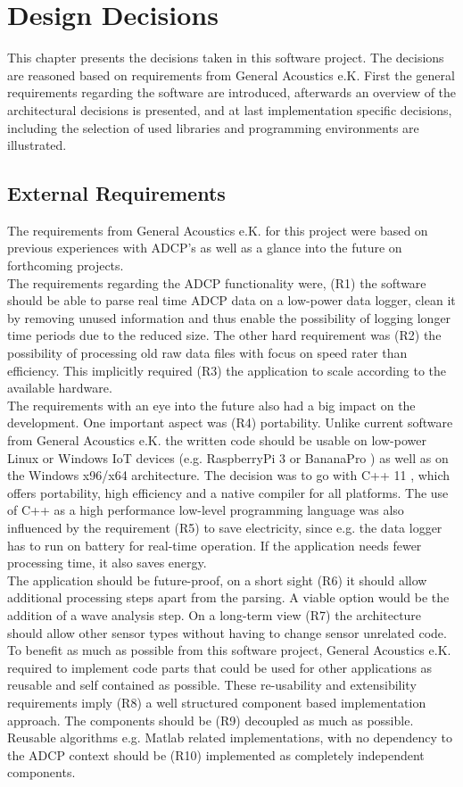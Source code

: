 
\chapter{Design Decisions}
This chapter presents the decisions taken in this software project. The decisions are reasoned based on requirements from General Acoustics e.K. First the general requirements regarding the software are introduced, afterwards an overview of the architectural decisions is presented, and at last implementation specific decisions, including the selection of used libraries and programming environments are illustrated. 
\section{External Requirements}
The requirements from General Acoustics e.K. for this project were based on previous experiences with ADCP's as well as a glance into the future on forthcoming projects.\\ 
The requirements regarding the ADCP functionality were, (R1) the software should be able to parse real time ADCP data on a low-power data logger, clean it by removing unused information and thus enable the possibility of logging longer time periods due to the reduced size. The other hard requirement was (R2) the possibility of processing old raw data files with focus on speed rater than efficiency. This implicitly required (R3) the application to scale according to the available hardware.\\ 
The requirements with an eye into the future also had a big impact on the development. One important aspect was (R4) portability. Unlike current software from General Acoustics e.K. the written code should be usable on low-power Linux or Windows IoT devices (e.g. RaspberryPi 3 \cite{raspberry} or BananaPro \cite{bananapro}) as well as on the Windows x96/x64 architecture. The decision was to go with C++ 11 \cite{cpp_11}, which offers portability, high efficiency and a native compiler for all platforms. The use of C++ as a high performance low-level programming language was also influenced by the requirement (R5) to save electricity, since e.g. the data logger has to run on battery for real-time operation. If the application needs fewer processing time, it also saves energy. \\
The application should be future-proof, on a short sight (R6) it should allow additional processing steps apart from the parsing. A viable option would be the addition of a wave analysis step. On a long-term view (R7) the architecture should allow other sensor types without having to change sensor unrelated code.\\ 
To benefit as much as possible from this software project, General Acoustics e.K. required to implement code parts that could be used for other applications as reusable and self contained as possible. These re-usability and extensibility requirements imply (R8) a well structured component based implementation approach. The components should be (R9) decoupled as much as possible. Reusable algorithms e.g. Matlab related implementations, with no dependency to the ADCP context should be (R10) implemented as completely independent components.\\

